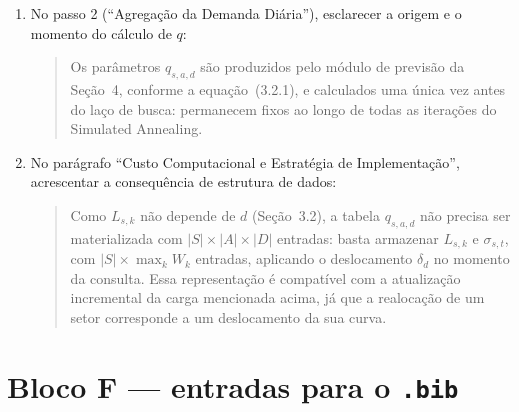 \documentclass[11pt]{article}
\begin{document}
\begin{enumerate}
  \item No passo 2 (``Agregação da Demanda Diária''), esclarecer a origem
    e o momento do cálculo de $q$:
    \begin{quote}
    Os parâmetros $q_{s,a,d}$ são produzidos pelo módulo de previsão da
    Seção~4, conforme a equação~(3.2.1), e calculados uma única vez antes
    do laço de busca: permanecem fixos ao longo de todas as iterações do
    Simulated Annealing.
    \end{quote}
  \item No parágrafo ``Custo Computacional e Estratégia de
    Implementação'', acrescentar a consequência de estrutura de dados:
    \begin{quote}
    Como $L_{s,k}$ não depende de $d$ (Seção~3.2), a tabela $q_{s,a,d}$
    não precisa ser materializada com $|S| \times |A| \times |D|$
    entradas: basta armazenar $L_{s,k}$ e $\sigma_{s,t}$, com
    $|S| \times \max_k W_k$ entradas, aplicando o deslocamento $\delta_d$
    no momento da consulta. Essa representação é compatível com a
    atualização incremental da carga mencionada acima, já que a
    realocação de um setor corresponde a um deslocamento da sua curva.
    \end{quote}
\end{enumerate}

\section*{Bloco F — entradas para o \texttt{.bib}}
\end{document}
